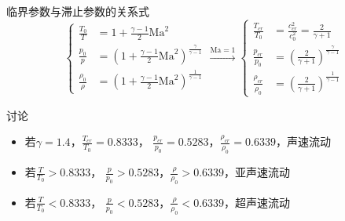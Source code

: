 \begin{frame}{临界参数与滞止参数的关系式}
  \vspace*{-1.5em}
  \begin{equation*}
    \left\{
      \begin{aligned}
    \frac{T_{0}}{T}
    &=
    1+\frac{\gamma-1}{2}\mathrm{Ma}^{2}
    \\
    \frac{p_{0}}{p}
    &=
    \left(1+\frac{\gamma-1}{2}\mathrm{Ma}^{2}\right)^{\frac{\gamma}{\gamma-1}}
    \\
    \frac{\rho_{0}}{\rho}
    &=
    \left(1+\frac{\gamma-1}{2}\mathrm{Ma}^{2}\right)^{\frac{1}{\gamma-1}}
      \end{aligned}
    \right.
    \xrightarrow{
      \mathrm{Ma}=1
  }
    \left\{
    \begin{aligned}
    \frac{T_{cr}}{T_{0}}
    &=
    \frac{c_{cr}^{2}}{c_{0}^{2}}
    =
    \frac{2}{\gamma+1}
    \\
    \frac{p_{cr}}{p_{0}}
    &=
    \left(\frac{2}{\gamma+1}\right)^{\frac{\gamma}{\gamma-1}}
    \\
    \frac{\rho_{cr}}{\rho_{0}}
    &=
    \left(\frac{2}{\gamma+1}\right)^{\frac{1}{\gamma-1}}
    \end{aligned}
    \right.
  \end{equation*}
  \vspace*{-1.5em}
  \begin{block}{讨论}
    \begin{itemize}
      \item 若$\gamma=1.4$，$\displaystyle \frac{T_{cr}}{T_{0}}=0.8333$，
        $\displaystyle \frac{p_{cr}}{p_{0}}=0.5283$，$\displaystyle
        \frac{\rho_{cr}}{\rho_{0}}=0.6339$，声速流动
      \item 若$\displaystyle \frac{T}{T_{0}}>0.8333$，
        $\displaystyle \frac{p}{p_{0}}>0.5283$，$\displaystyle
        \frac{\rho}{\rho_{0}}>0.6339$，亚声速流动
      \item 若$\displaystyle \frac{T}{T_{0}}<0.8333$，
        $\displaystyle \frac{p}{p_{0}}<0.5283$，$\displaystyle
        \frac{\rho}{\rho_{0}}<0.6339$，超声速流动
    \end{itemize}
  \end{block}
\end{frame}

